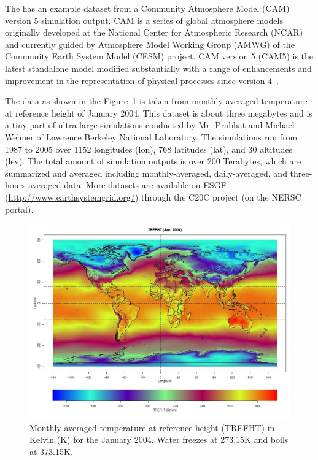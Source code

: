 The  has an example dataset  from a
Community Atmosphere Model (CAM) version 5 simulation output.
CAM is a series of global atmosphere models originally developed at the 
National Center for Atmospheric Research (NCAR) and currently guided by 
Atmosphere Model Working Group (AMWG) of the Community Earth System Model (CESM)
project. CAM version 5 (CAM5) is the latest standalone model modified
substantially with a range of enhancements and improvement in the 
representation of physical processes since version 4~\citep{CAM5,CESM1}.

The data  as shown in the Figure~\ref{fig:trefht}
is taken from monthly averaged temperature at reference height of January 2004.
This dataset is about three megabytes and is a tiny part of ultra-large 
simulations conducted by Mr. Prabhat and Michael Wehner of Lawrence Berkeley 
National Laboratory. The simulations run from 1987 to 2005 over 1152 longitudes 
(lon), 768 latitudes (lat), and 30 altitudes (lev). The total amount of 
simulation outputs is over 200 Terabytes, which are summarized and averaged 
including monthly-averaged, daily-averaged, and three-hours-averaged data.
More datasets are available on ESGF (\url{http://www.earthsystemgrid.org/})
through the C20C project (on the NERSC portal).
\begin{figure}[t]
  \centering
  \includegraphics[width=6.0in]{pbdDEMO-include/pics/trefht.jpg}
  \caption[Monthly averaged temperature]{Monthly averaged temperature at reference height (TREFHT) in
           Kelvin (K) for the January 2004. Water freezes at 273.15K and
           boils at 373.15K.}
  \label{fig:trefht}
\end{figure}

